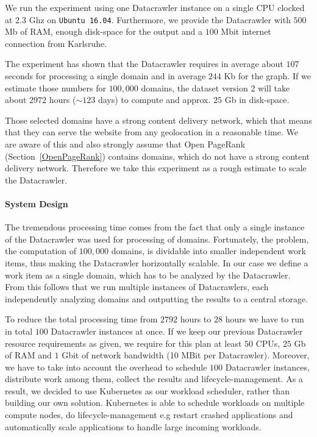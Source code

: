 We run the experiment using one Datacrawler instance on a single CPU clocked at $2.3$ Ghz on \texttt{Ubuntu 16.04}. Furthermore, we provide the Datacrawler with $500$ Mb of RAM, enough disk-space for the output and a $100$ Mbit internet connection from Karlsruhe.

The experiment has shown that the Datacrawler requires in average about $107$ seconds for processing a single domain and in average $244$ Kb for the graph. If we estimate those numbers for $100,000$ domains, the dataset version 2 will take about $2972$ hours ($\sim 123$ days) to compute and approx. $25$ Gb in disk-space.

Those selected domains have a strong content delivery network, which that means that they can serve the website from any geolocation in a reasonable time. We are aware of this and also strongly assume that Open PageRank (Section~\ref{OpenPageRank}) contains domains, which do not have a strong content delivery network. Therefore we take this experiment as a rough estimate to scale the Datacrawler.

\paragraph*{System Design}
\label{datacrawler_scale_architecture}
The tremendous processing time comes from the fact that only a single instance of the Datacrawler was used for processing of domains. Fortunately, the problem, the computation of $100,000$ domains, is dividable into smaller independent work items, thus making the Datacrawler horizontally scalable. In our case we define a work item as a single domain, which has to be analyzed by the Datacrawler. From this follows that we run multiple instances of Datacrawlers, each independently analyzing domains and outputting the results to a central storage.

To reduce the total processing time from $2792$ hours to $28$ hours we have to run in total $100$ Datacrawler instances at once. If we keep our previous Datacrawler resource requirements as given, we require for this plan at least $50$ CPUs, $25$ Gb of RAM and $1$ Gbit of network bandwidth (10 MBit per Datacrawler). Moreover, we have to take into account the overhead to schedule $100$ Datacrawler instances, distribute work among them, collect the results and lifecycle-management. As a result, we decided to use Kubernetes as our workload scheduler, rather than building our own solution. Kubernetes is able to schedule workloads on multiple compute nodes, do lifecycle-management e.g restart crashed applications and automatically scale applications to handle large incoming workloads.

